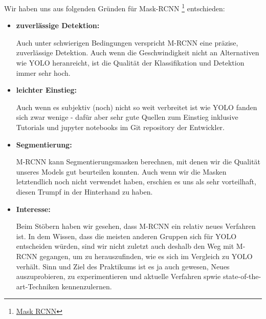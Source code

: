 Wir haben uns aus folgenden Gründen für Mask-RCNN \footnote{\href{https://github.com/matterport/Mask_RCNN}{Mask RCNN}} entschieden:
\begin{itemize}
	\item \textbf{zuverlässige Detektion:}

Auch unter schwierigen Bedingungen verspricht M-RCNN eine präzise, zuverlässige Detektion. Auch wenn die Geschwindigkeit nicht an Alternativen wie YOLO heranreicht, ist die Qualität der Klassifikation und Detektion immer sehr hoch.
	\item \textbf{leichter Einstieg:}

Auch wenn es subjektiv (noch) nicht so weit verbreitet ist wie YOLO fanden sich zwar wenige - dafür aber sehr gute Quellen zum Einstieg inklusive Tutorials und jupyter notebooks im Git repository der Entwickler.
	\item \textbf{Segmentierung:}

M-RCNN kann Segmentierungsmasken berechnen, mit denen wir die Qualität unseres Models gut beurteilen konnten.
Auch wenn wir die Masken letztendlich noch nicht verwendet haben, erschien es uns als sehr vorteilhaft, diesen Trumpf in der Hinterhand zu haben.
	\item \textbf{Interesse:}

Beim Stöbern haben wir gesehen, dass M-RCNN ein relativ neues Verfahren ist.
In dem Wissen, dass die meisten anderen Gruppen sich für YOLO entscheiden würden, sind wir nicht zuletzt auch deshalb den Weg mit M-RCNN gegangen, um zu herauszufinden, wie es sich im Vergleich zu YOLO verhält. Sinn und Ziel des Praktikums ist es ja auch gewesen, Neues auszuprobieren, zu experimentieren und aktuelle Verfahren spwie state-of-the-art-Techniken kennenzulernen.

\end{itemize}
